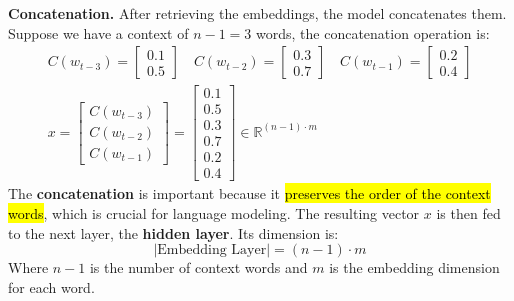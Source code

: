 \begin{enumerate}
    \highspace
    \textcolor{Green3}{ \textbf{Concatenation.}} After retrieving the embeddings, the model concatenates them. Suppose we have a context of $n-1=3$ words, the concatenation operation is:
    \begin{gather*}
        C\left(w_{t-3}\right) = \begin{bmatrix}
            0.1 \\
            0.5
        \end{bmatrix}
        \quad
        C\left(w_{t-2}\right) = \begin{bmatrix}
            0.3 \\
            0.7
        \end{bmatrix}
        \quad
        C\left(w_{t-1}\right) = \begin{bmatrix}
            0.2 \\
            0.4
        \end{bmatrix} \\
        x = \begin{bmatrix}
            C\left(w_{t-3}\right) \\
            C\left(w_{t-2}\right) \\
            C\left(w_{t-1}\right)
        \end{bmatrix} = \begin{bmatrix}
            0.1 \\
            0.5 \\
            0.3 \\
            0.7 \\
            0.2 \\
            0.4
        \end{bmatrix} \in \mathbb{R}^{(n-1) \cdot m}
    \end{gather*}
    The \textbf{concatenation} is important because it \hl{preserves the order of the context words}, which is crucial for language modeling. The resulting vector $x$ is then fed to the next layer, the \textbf{hidden layer}. Its dimension is:
    \begin{equation*}
        \left|\text{Embedding Layer}\right| = \left(n-1\right) \cdot m
    \end{equation*}
    Where $n-1$ is the number of context words and $m$ is the embedding dimension for each word.
    

\end{enumerate}
